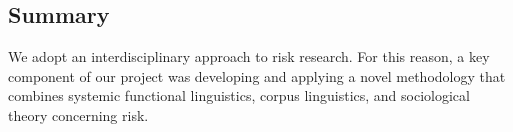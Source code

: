 \documentclass{report}
\begin{document}
\subsection{Summary}

We adopt an interdisciplinary approach to risk research. For this reason, a key component of our project was developing and applying a novel methodology that combines systemic functional linguistics, corpus linguistics, and sociological theory concerning risk.

























    \cleardoublepage
    \singlespacing
    \printendnotes
    \cleardoublepage
    \singlespacing
    
    
    \cleardoublepage

    
\end{document}
